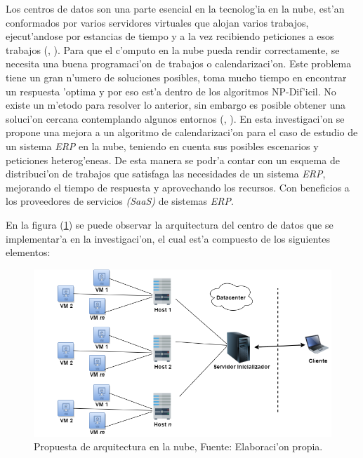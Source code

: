 Los centros de datos son una parte esencial en la tecnolog'ia en la nube, est'an conformados por varios servidores virtuales que alojan varios trabajos, ejecut'andose por estancias de tiempo y a la vez recibiendo peticiones a esos trabajos (\citeauthor{shimpy2014different}, \citeyear{shimpy2014different}).
Para que el c'omputo en la nube pueda rendir correctamente, se necesita una buena programaci'on de trabajos o calendarizaci'on. Este problema tiene un gran n'umero de soluciones posibles, toma mucho tiempo en encontrar un respuesta 'optima y por eso est'a dentro de los algoritmos NP-Dif'icil. No existe un m'etodo para resolver lo anterior, sin embargo es posible obtener una soluci'on cercana contemplando algunos entornos (\citeauthor{shimpy2014different}, \citeyear{shimpy2014different}).
En esta investigaci'on se propone una mejora a un algoritmo de calendarizaci'on para el caso de estudio de un sistema \textit{ERP} en la nube, teniendo en cuenta sus posibles escenarios y peticiones heterog'eneas. De esta manera se podr'a contar con un esquema de distribuci'on de trabajos que satisfaga las necesidades de un sistema \textit{ERP}, mejorando el tiempo de respuesta y aprovechando los recursos. Con beneficios a los proveedores de servicios \textit{(SaaS)} de sistemas \textit{ERP}.


En la figura (\ref{fig:uno}) se puede observar la arquitectura del centro de datos que se implementar'a en la investigaci'on, el cual est'a compuesto de los siguientes elementos:

\newpage

\setcounter{figure}{0}
\renewcommand\thefigure{\arabic{figure}}
\begin{figure}[h!]
	
	\centering
	\includegraphics[scale=0.5]{media/cloud2}
	\caption{Propuesta de arquitectura en la nube, Fuente: Elaboraci'on propia.}
	\label{fig:uno}
\end{figure}





